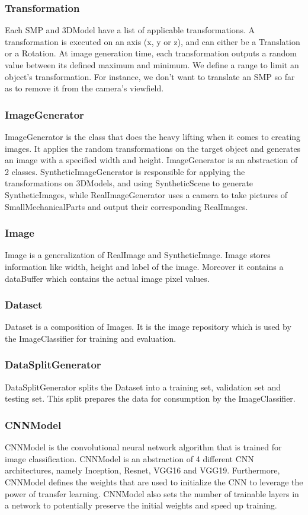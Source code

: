\subsubsection{Transformation}
Each SMP and 3DModel have a list of applicable transformations. A transformation is executed on an axis (x, y or z), and can either be a Translation or a Rotation.
At image generation time, each transformation outputs a random value between its defined maximum and minimum. We define a range to limit an object's transformation. For instance, we don't want to translate an SMP so far as to remove it from the camera's viewfield.

\subsubsection{ImageGenerator}
ImageGenerator is the class that does the heavy lifting when it comes to creating images. It applies the random transformations on the target object and generates an image with a specified width and height.
ImageGenerator is an abstraction of 2 classes. SyntheticImageGenerator is responsible for applying the transformations on 3DModels, and using SyntheticScene to generate SyntheticImages, while RealImageGenerator uses a camera to take pictures of SmallMechanicalParts and output their corresponding RealImages.

\subsubsection{Image}
Image is a generalization of RealImage and SyntheticImage. Image stores information like width, height and label of the image. Moreover it contains a dataBuffer which contains the actual image pixel values.

\subsubsection{Dataset}
Dataset is a composition of Images. It is the image repository which is used by the ImageClassifier for training and evaluation.

\subsubsection{DataSplitGenerator}
DataSplitGenerator splits the Dataset into a training set, validation set and testing set. This split prepares the data for consumption by the ImageClassifier.

\subsubsection{CNNModel}
CNNModel is the convolutional neural network algorithm that is trained for image classification. CNNModel is an abstraction of 4 different CNN architectures, namely Inception, Resnet, VGG16 and VGG19. Furthermore, CNNModel defines the weights that are used to initialize the CNN to leverage the power of transfer learning. CNNModel also sets the number of trainable layers in a network to potentially preserve the initial weights and speed up training.

